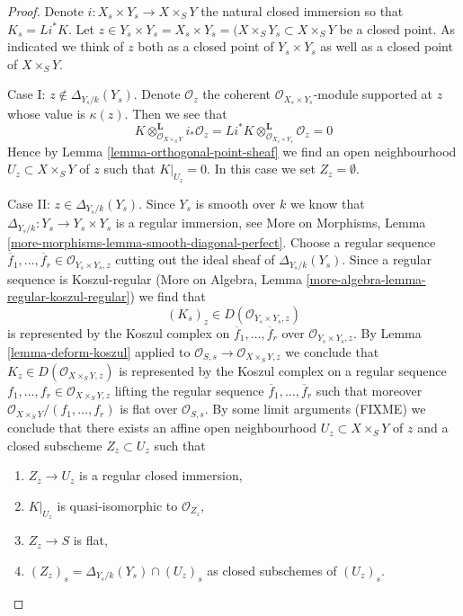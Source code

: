 \begin{proof}
Denote $i : X_s \times Y_s \to X \times_S Y$
the natural closed immersion so that $K_s = Li^*K$. Let
$z \in Y_s \times Y_s = X_s \times Y_s = (X \times_S Y_s \subset X \times_S Y$
be a closed point. As indicated we think of $z$ both as a closed point
of $Y_s \times Y_s$ as well as a closed point of $X \times_S Y$.

\medskip\noindent
Case I: $z \not \in \Delta_{Y_s/k}(Y_s)$. Denote $\mathcal{O}_z$
the coherent $\mathcal{O}_{X_s \times Y_s}$-module supported at $z$
whose value is $\kappa(z)$. Then we see that
$$
K \otimes_{\mathcal{O}_{X \times_S Y}}^\mathbf{L} i_*\mathcal{O}_z =
Li^*K \otimes_{\mathcal{O}_{X_s \times Y_s}}^\mathbf{L} \mathcal{O}_z = 0
$$
Hence by Lemma \ref{lemma-orthogonal-point-sheaf}
we find an open neighbourhood $U_z \subset X \times_S Y$ of $z$
such that $K|_{U_z} = 0$. In this case we set $Z_z = \emptyset$.

\medskip\noindent
Case II: $z \in \Delta_{Y_s/k}(Y_s)$. Since $Y_s$ is smooth over $k$
we know that $\Delta_{Y_s/k} : Y_s \to Y_s \times Y_s$ is a
regular immersion, see More on Morphisms, Lemma
\ref{more-morphisms-lemma-smooth-diagonal-perfect}.
Choose a regular sequence $\overline{f}_1, \ldots, \overline{f}_r \in
\mathcal{O}_{Y_s \times Y_s, z}$ cutting out the ideal sheaf of
$\Delta_{Y_s/k}(Y_s)$. Since a regular sequence is Koszul-regular
(More on Algebra, Lemma \ref{more-algebra-lemma-regular-koszul-regular})
we find that
$$
(K_s)_z \in D(\mathcal{O}_{Y_s \times Y_s, z})
$$
is represented by the Koszul complex on
$\overline{f}_1, \ldots, \overline{f}_r$ over
$\mathcal{O}_{Y_s \times Y_s, z}$.
By Lemma \ref{lemma-deform-koszul} applied to
$\mathcal{O}_{S, s} \to \mathcal{O}_{X \times_S Y, z}$
we conclude that $K_z \in D(\mathcal{O}_{X \times_S Y, z})$ is
represented by the Koszul complex on a regular sequence
$f_1, \ldots, f_r \in \mathcal{O}_{X \times_S Y, z}$
lifting the regular sequence
$\overline{f}_1, \ldots, \overline{f}_r$
such that moreover $\mathcal{O}_{X \times_S Y}/(f_1, \ldots, f_r)$
is flat over $\mathcal{O}_{S, s}$.
By some limit arguments (FIXME)
we conclude that there exists an affine open neighbourhood
$U_z \subset X \times_S Y$ of $z$ and a closed subscheme
$Z_z \subset U_z$ such that
\begin{enumerate}
\item $Z_z \to U_z$ is a regular closed immersion,
\item $K|_{U_z}$ is quasi-isomorphic to $\mathcal{O}_{Z_z}$,
\item $Z_z \to S$ is flat,
\item $(Z_z)_s = \Delta_{Y_s/k}(Y_s) \cap (U_z)_s$
as closed subschemes of $(U_z)_s$.
\end{enumerate}


\end{proof}

